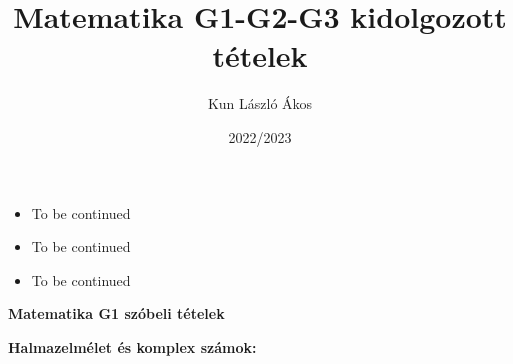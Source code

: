 \documentclass[12pt,a4paper]{article}
\title{Matematika G1-G2-G3 kidolgozott tételek}
\author{Kun László Ákos}
\date{2022/2023}
\begin{document}
\maketitle{}
\begin{tcolorbox}[colback=green!5!white,colframe=green!60!black,title= MINTA!!]
    \begin{itemize}
        \item To be continued
    \end{itemize}
\end{tcolorbox}
\begin{tcolorbox}[colback=blue!5!white,colframe=blue!60!black,title= MINTA!!]
    \begin{itemize}
        \item To be continued
    \end{itemize}
\end{tcolorbox}
\begin{tcolorbox}[colback=red!5!white,colframe=red!60!black,title= MINTA!!]
    \begin{itemize}
        \item To be continued
    \end{itemize}
\end{tcolorbox}

\newpage
\begin{center}
    \textbf{Matematika G1 szóbeli tételek}
\end{center}
\textbf{Halmazelmélet és komplex számok:}
\end{document}
